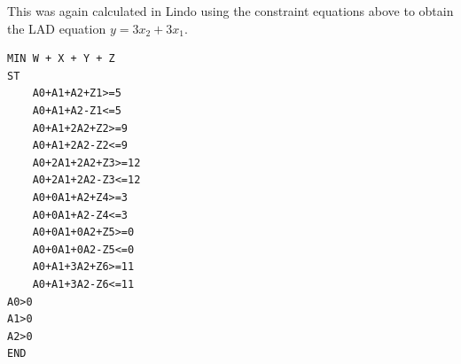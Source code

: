 \documentclass[11pt,letterpaper]{article}
\begin{document}
This was again calculated in Lindo using the constraint equations above to obtain the LAD equation $y = 3x_2 + 3x_1$.\vspace{8pt}

\begin{verbatim}
MIN W + X + Y + Z
ST
    A0+A1+A2+Z1>=5
    A0+A1+A2-Z1<=5
    A0+A1+2A2+Z2>=9
    A0+A1+2A2-Z2<=9
    A0+2A1+2A2+Z3>=12
    A0+2A1+2A2-Z3<=12
    A0+0A1+A2+Z4>=3
    A0+0A1+A2-Z4<=3
    A0+0A1+0A2+Z5>=0
    A0+0A1+0A2-Z5<=0
    A0+A1+3A2+Z6>=11
    A0+A1+3A2-Z6<=11
A0>0
A1>0
A2>0
END
\end{verbatim}
\end{document}
